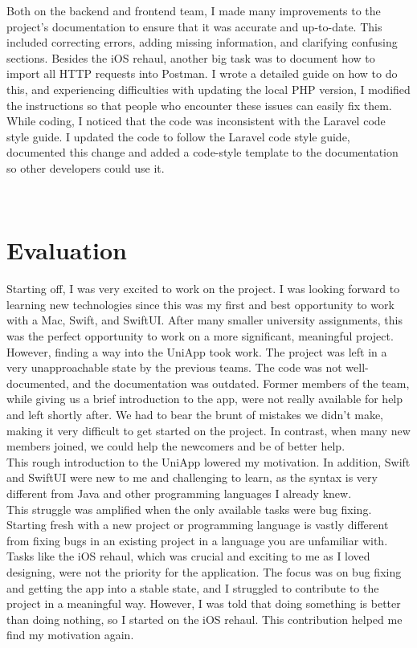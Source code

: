 \documentclass[sf-font,usefira,english]{uulm/sp/article}
\begin{document}
Both on the backend and frontend team, I made many improvements to the project’s documentation to ensure that it was accurate and up-to-date. 
This included correcting errors, adding missing information, and clarifying confusing sections. 
Besides the iOS rehaul, another big task was to document how to import all HTTP requests into Postman.
I wrote a detailed guide on how to do this, and experiencing difficulties with updating the local PHP version, I modified the instructions so that people who encounter these issues can easily fix them.\\
While coding, I noticed that the code was inconsistent with the Laravel code style guide. 
I updated the code to follow the Laravel code style guide, documented this change and added a code-style template to the documentation so other developers could use it.

\\

\section{Evaluation}

Starting off, I was very excited to work on the project. 
I was looking forward to learning new technologies since this was my first and best opportunity to work with a Mac, Swift, and SwiftUI. 
After many smaller university assignments, this was the perfect opportunity to work on a more significant, meaningful project.\\

However, finding a way into the UniApp took work. 
The project was left in a very unapproachable state by the previous teams. 
The code was not well-documented, and the documentation was outdated. 
Former members of the team, while giving us a brief introduction to the app, were not really available for help and left shortly after. 
We had to bear the brunt of mistakes we didn't make, making it very difficult to get started on the project. 
In contrast, when many new members joined, we could help the newcomers and be of better help.\\

This rough introduction to the UniApp lowered my motivation.
In addition, Swift and SwiftUI were new to me and challenging to learn, as the syntax is very different from Java and other programming languages I already knew.\\
This struggle was amplified when the only available tasks were bug fixing. 
Starting fresh with a new project or programming language is vastly different from fixing bugs in an existing project in a language you are unfamiliar with. 
Tasks like the iOS rehaul, which was crucial and exciting to me as I loved designing, were not the priority for the application. 
The focus was on bug fixing and getting the app into a stable state, and I struggled to contribute to the project in a meaningful way. 
However, I was told that doing something is better than doing nothing, so I started on the iOS rehaul.
This contribution helped me find my motivation again.\\
\end{document}
